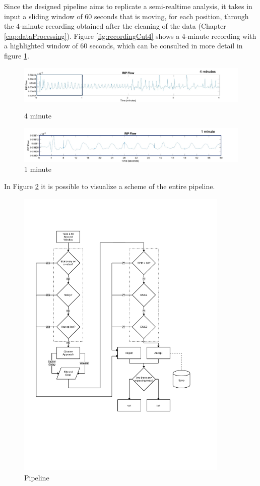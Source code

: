 Since the designed pipeline aims to replicate a semi-realtime analysis, it takes in input a sliding window of 60 seconds that is moving, for each position, through the 4-minute recording obtained after the cleaning of the data (Chapter \ref{cap:dataProcessing}). Figure \ref{fig:recordingCut4} shows a 4-minute recording with a highlighted window of 60 seconds, which can be consulted in more detail in figure \ref{fig:recordingCut1}.

\begin{figure}[h]
    \centering    
    \includegraphics[width=1.1\textwidth]{img/4minute.pdf}
    \caption{4 minute}
    \label{fig:recordingCut4}
    \includegraphics[width=1.1\textwidth]{img/1minute.pdf}
    \caption{1 minute}
    \label{fig:recordingCut1}
\end{figure}

In Figure \ref{fig:pipeline} it is possible to visualize a scheme of the entire pipeline.

\begin{figure}[p]
    \centering
    \includegraphics[width=0.9\textwidth]{img/pipeline.pdf}
    \caption{Pipeline}
    \label{fig:pipeline}
\end{figure}

